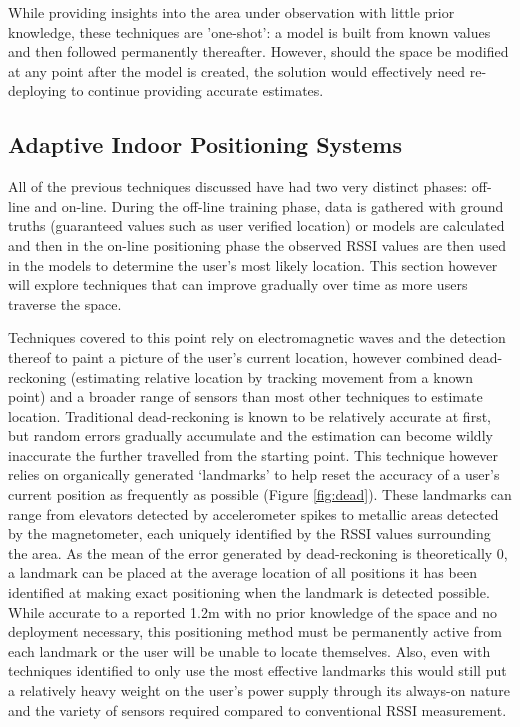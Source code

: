 \documentclass{UoYCSproject}
\begin{document}
                While providing insights into the area under observation with little prior knowledge, these techniques are 'one-shot': a model is built from known values and then followed permanently thereafter. However, should the space be modified at any point after the model is created, the solution would effectively need re-deploying to continue providing accurate estimates.
            
            \subsection{Adaptive Indoor Positioning Systems}
            \label{sec:adaptive}
            
                All of the previous techniques discussed have had two very distinct phases: off-line and on-line. During the off-line training phase, data is gathered with ground truths (guaranteed values such as user verified location) or models are calculated and then in the on-line positioning phase the observed RSSI values are then used in the models to determine the user's most likely location. This section however will explore techniques that can improve gradually over time as more users traverse the space.
                
                Techniques covered to this point rely on electromagnetic waves and the detection thereof to paint a picture of the user's current location, however \citet{wang2012no} combined dead-reckoning (estimating relative location by tracking movement from a known point) and a broader range of sensors than most other techniques to estimate location. Traditional dead-reckoning is known to be relatively accurate at first, but random errors gradually accumulate and the estimation can become wildly inaccurate the further travelled from the starting point. This technique however relies on organically generated `landmarks' to help reset the accuracy of a user's current position as frequently as possible (Figure \ref{fig:dead}). These landmarks can range from elevators detected by accelerometer spikes to metallic areas detected by the magnetometer, each uniquely identified by the RSSI values surrounding the area. As the mean of the error generated by dead-reckoning is theoretically $0$, a landmark can be placed at the average location of all positions it has been identified at making exact positioning when the landmark is detected possible. While accurate to a reported 1.2m with no prior knowledge of the space and no deployment necessary, this positioning method must be permanently active from each landmark or the user will be unable to locate themselves. Also, even with techniques identified to only use the most effective landmarks this would still put a relatively heavy weight on the user's power supply through its always-on nature and the variety of sensors required compared to conventional RSSI measurement.
                
\end{document}
